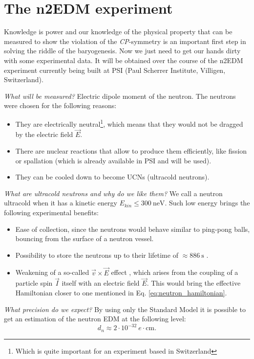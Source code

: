 \chapter{The n2EDM experiment}
\label{chapter:experiment}

Knowledge is power and our knowledge of the physical property that can be measured to show the violation of the \textit{CP}-symmetry is an important first step in solving the riddle of the baryogenesis. Now we just need to get our hands dirty with some experimental data. It will be obtained over the course of the n2EDM experiment currently being built at PSI (Paul Scherrer Institute, Villigen, Switzerland).

\textit{What will be measured?} Electric dipole moment of the neutron. The neutrons were chosen for the following reasons:
\begin{itemize}
	\item They are electrically neutral\footnote{Which is quite important for an experiment based in Switzerland}, which means that they would not be dragged by the electric field $\vec{E}$.
	\item There are nuclear reactions that allow to produce them efficiently, like fission or spallation (which is already available in PSI and will be used).
	\item They can be cooled down to become UCNs (ultracold neutrons).
\end{itemize}

\textit{What are ultracold neutrons and why do we like them?} We call \cite{Fermi1936} a neutron ultracold when it has a kinetic energy $E_{kin} \leq 300\ \text{neV}$. Such low energy brings the following experimental benefits:
\begin{itemize}
	\item Ease of collection, since the neutrons would behave similar to ping-pong balls, bouncing from the surface of a neutron vessel.
	\item Possibility to store \cite{Zeldovich1959} the neutrons up to their lifetime of $\approx 886\ \text{s}$ \cite{Tanabashi2018}.
	\item Weakening of a so-called $\vec{v} \times \vec{E}$ effect \cite{Pendlebury2004}, which arises from the coupling of a particle spin $\vec{I}$ itself with an electric field $\vec{E}$. This would bring the effective Hamiltonian closer to one mentioned in Eq. \ref{eq:neutron_hamiltonian}.
\end{itemize}

\textit{What precision do we expect?} By using only the Standard Model it is possible to get an estimation \cite{Khriplovich1982} of the neutron EDM at the following level:
\begin{equation}
	d_n \approx 2 \cdot 10^{-32}\ e \cdot \text{cm}.
\end{equation}


